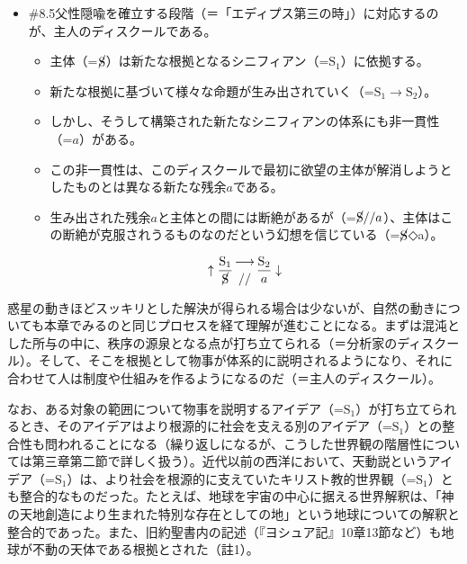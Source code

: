 \begin{note}{}
  \begin{itemize}
    \tightlist
    \item{\#8.5}父性隠喩を確立する段階（＝「エディプス第三の時」）に対応するのが、主人のディスクールである。
      \begin{itemize}
        \tightlist
        \item 主体（=$\cancel{\textrm{S}}$）は新たな根拠となるシニフィアン（=$\textrm{S}_1$）に依拠する。
        \item 新たな根拠に基づいて様々な命題が生み出されていく（=$\textrm{S}_1\rightarrow\textrm{S}_2$）。
        \item しかし、そうして構築された新たなシニフィアンの体系にも非一貫性（=$a$）がある。
        \item この非一貫性は、このディスクールで最初に欲望の主体が解消しようとしたものとは異なる新たな残余$a$である。
        \item 生み出された残余$a$と主体との間には断絶があるが（=$\cancel{\textrm{S}}//a$）、主体はこの断絶が克服されうるものなのだという幻想を信じている（=$\cancel{\textrm{S}}$◇a）。
      \end{itemize}

$$
\uparrow\frac{\mathrm{S_1}}{\cancel{\textrm{S}}}\genfrac{}{}{0pt}{}{\longrightarrow}{//}\frac{\mathrm{S_2}}{a}\downarrow
$$
  \end{itemize}
\end{note}

惑星の動きほどスッキリとした解決が得られる場合は少ないが、自然の動きについても本章でみるのと同じプロセスを経て理解が進むことになる。まずは混沌とした所与の中に、秩序の源泉となる点が打ち立てられる（＝分析家のディスクール）。そして、そこを根拠として物事が体系的に説明されるようになり、それに合わせて人は制度や仕組みを作るようになるのだ（＝主人のディスクール）。

なお、ある対象の範囲について物事を説明するアイデア（=\(\textrm{S}_1\)）が打ち立てられるとき、そのアイデアはより根源的に社会を支える別のアイデア（=\(\textrm{S}_1\)）との整合性も問われることになる（繰り返しになるが、こうした世界観の階層性については第三章第二節で詳しく扱う）。近代以前の西洋において、天動説というアイデア（=\(\textrm{S}_1\)）は、より社会を根源的に支えていたキリスト教的世界観（=\(\textrm{S}_1\)）とも整合的なものだった。たとえば、地球を宇宙の中心に据える世界解釈は、「神の天地創造により生まれた特別な存在としての地」という地球についての解釈と整合的であった。また、旧約聖書内の記述（『ヨシュア記』10章13節など）も地球が不動の天体である根拠とされた（註1）。

